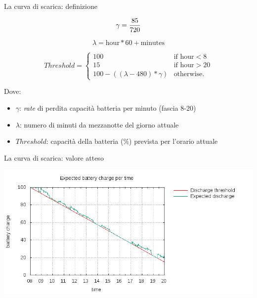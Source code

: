 \begin{frame}[c]{La curva di scarica: definizione}

\begin{equation}
\gamma = {85 \over 720}
\end{equation}

\begin{equation}
\lambda = \text{hour} * 60 + \text{minutes}
\end{equation}

\begin{equation}
    Threshold =
    \begin{cases}
        100 & \text{if hour} < 8\\
        15 & \text{if hour} > 20\\
        {100 - ((\lambda - 480) * \gamma)} & \text{otherwise.}
    \end{cases}
\end{equation}

Dove:
\begin{itemize}
\item $\gamma$: \textit{rate} di perdita capacità batteria per minuto (fascia 8-20)
\item $\lambda$: numero di minuti da mezzanotte del giorno attuale
\item $Threshold$: capacità della batteria (\%) prevista per l'orario attuale
\end{itemize}

\end{frame}

\begin{frame}[c]{La curva di scarica: valore atteso}

\begin{center}
\includegraphics[width=\textwidth]{database/expectedplot}
\end{center}

\end{frame}


